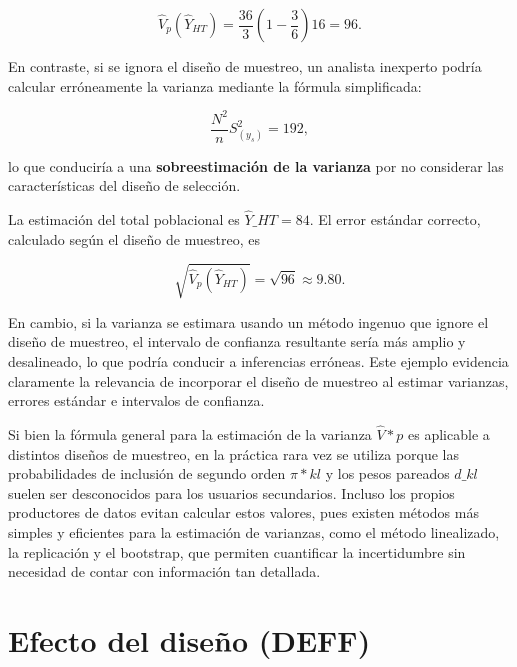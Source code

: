 \documentclass[
  12pt,
]{book}
\begin{document}
\[
\hat{V}_p(\hat{Y}_{HT}) = \frac{36}{3}\left(1-\frac{3}{6}\right)16 = 96.
\]

En contraste, si se ignora el diseño de muestreo, un analista inexperto podría calcular erróneamente la varianza mediante la fórmula simplificada:

\[
\frac{N^2}{n}S_{(y_s)}^2 = 192,
\]

lo que conduciría a una \textbf{sobreestimación de la varianza} por no considerar las características del diseño de selección.

La estimación del total poblacional es \(\hat{Y}\_{HT}=84\). El error estándar correcto, calculado según el diseño de muestreo, es

\[
\sqrt{\hat{V}_p(\hat{Y}_{HT})} = \sqrt{96} \approx 9.80.
\]

En cambio, si la varianza se estimara usando un método ingenuo que ignore el diseño de muestreo, el intervalo de confianza resultante sería más amplio y desalineado, lo que podría conducir a inferencias erróneas. Este ejemplo evidencia claramente la relevancia de incorporar el diseño de muestreo al estimar varianzas, errores estándar e intervalos de confianza.

Si bien la fórmula general para la estimación de la varianza \(\hat{V}*p\) es aplicable a distintos diseños de muestreo, en la práctica rara vez se utiliza porque las probabilidades de inclusión de segundo orden \(\pi*{kl}\) y los pesos pareados \(d\_{kl}\) suelen ser desconocidos para los usuarios secundarios. Incluso los propios productores de datos evitan calcular estos valores, pues existen métodos más simples y eficientes para la estimación de varianzas, como el método linealizado, la replicación y el bootstrap, que permiten cuantificar la incertidumbre sin necesidad de contar con información tan detallada.

\section{Efecto del diseño (DEFF)}\label{efecto-del-diseuxf1o-deff}
\end{document}
